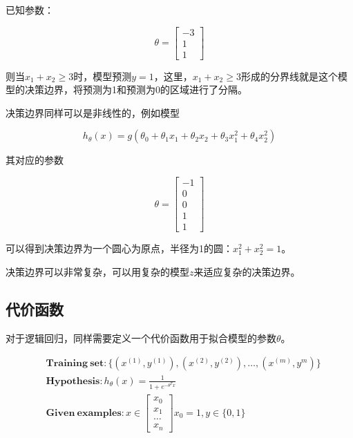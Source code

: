 \documentclass[12pt, a4paper]{article}
\begin{document}
已知参数：

\begin{equation*}
    \theta=\left[
        \begin{matrix}
            -3 \\
            1  \\
            1
        \end{matrix}
        \right]
\end{equation*}

则当$x_1+x_2\geq 3$时，模型预测$y=1$，这里，$x_1+x_2\geq 3$形成的分界线就是这个模型的决策边界，将预测为1和预测为0的区域进行了分隔。

决策边界同样可以是非线性的，例如模型

\begin{equation*}
    h_\theta(x)=g(\theta_0+\theta_1x_1+\theta_2x_2+\theta_3x_1^2+\theta_4x_2^2)
\end{equation*}

其对应的参数

\begin{equation*}
    \theta=\left[
        \begin{matrix}
            -1 \\
            0  \\
            0  \\
            1  \\
            1
        \end{matrix}
        \right]
\end{equation*}

可以得到决策边界为一个圆心为原点，半径为1的圆：$x_1^2+x_2^2=1$。

决策边界可以非常复杂，可以用复杂的模型$z$来适应复杂的决策边界。

\subsection{代价函数}

对于逻辑回归，同样需要定义一个代价函数用于拟合模型的参数$\theta$。

\begin{align*}
     & \mathbf{Training\ set}: \{(x^{(1)}, y^{(1)}), (x^{(2)}, y^{(2)}), \dots, (x^{(m)}, y^{m})\} \\
     & \mathbf{Hypothesis}: h_\theta(x)=\frac{1}{1+e^{-\theta^Tx}}                                 \\
     & \mathbf{Given\ examples}: x\in\left[
        \begin{matrix}
            x_0   \\
            x_1   \\
            \dots \\
            x_n
        \end{matrix}
        \right] x_0=1, y\in\{0, 1\}
\end{align*}
\end{document}
